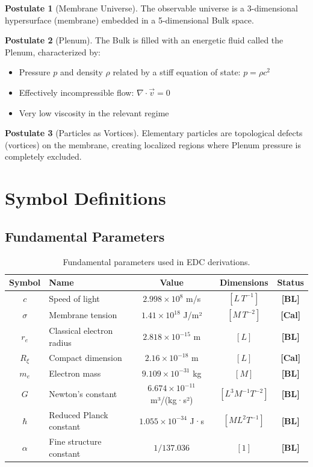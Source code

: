 \documentclass[12pt,a4paper,openany]{book}
\theoremstyle{definition}
\newtheorem{postulate}{Postulate}[chapter]
\theoremstyle{plain}
\theoremstyle{remark}
\newcommand{\re}{r_e}                      %
\newcommand{\Rxi}{R_\xi}                   %
\newcommand{\baseline}{\textcolor{edcgray}{\textbf{[BL]}}}
\newcommand{\calibrated}{\textcolor{edcgray}{\textbf{[Cal]}}}
\begin{document}
\begin{postulate}[Membrane Universe]
The observable universe is a 3-dimensional hypersurface (membrane) embedded in a 5-dimensional Bulk space.
\end{postulate}

\begin{postulate}[Plenum]
The Bulk is filled with an energetic fluid called the Plenum, characterized by:
\begin{itemize}
    \item Pressure $p$ and density $\rho$ related by a stiff equation of state: $p = \rho c^2$
    \item Effectively incompressible flow: $\nabla \cdot \vec{v} = 0$
    \item Very low viscosity in the relevant regime
\end{itemize}
\end{postulate}

\begin{postulate}[Particles as Vortices]
Elementary particles are topological defects (vortices) on the membrane, creating localized regions where Plenum pressure is completely excluded.
\end{postulate}

\section{Symbol Definitions}

\subsection{Fundamental Parameters}

\begin{table}[H]
\centering
\begin{tabular}{|c|l|c|c|c|}
\hline
\textbf{Symbol} & \textbf{Name} & \textbf{Value} & \textbf{Dimensions} & \textbf{Status} \\
\hline
$c$ & Speed of light & $2.998 \times 10^8$ m/s & $[L\,T^{-1}]$ & \baseline \\
$\sigma$ & Membrane tension & $1.41 \times 10^{18}$ J/m² & $[M\,T^{-2}]$ & \calibrated \\
$\re$ & Classical electron radius & $2.818 \times 10^{-15}$ m & $[L]$ & \baseline \\
$\Rxi$ & Compact dimension & $2.16 \times 10^{-18}$ m & $[L]$ & \calibrated \\
$m_e$ & Electron mass & $9.109 \times 10^{-31}$ kg & $[M]$ & \baseline \\
$G$ & Newton's constant & $6.674 \times 10^{-11}$ m³/(kg·s²) & $[L^3 M^{-1} T^{-2}]$ & \baseline \\
$\hbar$ & Reduced Planck constant & $1.055 \times 10^{-34}$ J·s & $[M L^2 T^{-1}]$ & \baseline \\
$\alpha$ & Fine structure constant & $1/137.036$ & $[1]$ & \baseline \\
\hline
\end{tabular}
\caption{Fundamental parameters used in EDC derivations.}
\label{tab:parameters}
\end{table}
\end{document}
